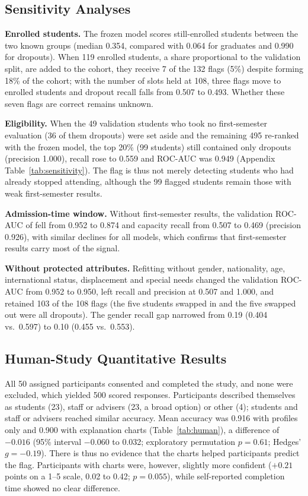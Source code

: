 \subsection{Sensitivity Analyses}
\label{sec:sensitivity}

\textbf{Enrolled students.} The frozen model scores still-enrolled students between the two known
groups (median 0.354, compared with 0.064 for graduates and 0.990 for dropouts). When 119 enrolled
students, a share proportional to the validation split, are added to the cohort, they receive 7 of
the 132 flags (5\%) despite forming 18\% of the cohort; with the number of slots held at 108, three flags move to enrolled students and
dropout recall falls from 0.507 to 0.493. Whether these seven flags are correct remains unknown.

\textbf{Eligibility.} When the 49 validation students who took no first-semester evaluation (36 of
them dropouts) were set aside and the remaining 495 re-ranked with the frozen model, the top 20\%
(99 students) still contained only dropouts (precision 1.000), recall rose to 0.559 and ROC-AUC was
0.949 (Appendix Table~\ref{tab:sensitivity}). The flag is thus not merely detecting students who had
already stopped attending, although the 99 flagged students remain those with weak first-semester
results.

\textbf{Admission-time window.} Without first-semester results, the validation ROC-AUC of \tabicl
fell from 0.952 to 0.874 and capacity recall from 0.507 to 0.469 (precision 0.926), with similar
declines for all models, which confirms that first-semester results carry most of the signal.

\textbf{Without protected attributes.} Refitting \tabicl without gender, nationality, age,
international status, displacement and special needs changed the validation ROC-AUC from 0.952 to
0.950, left recall and precision at 0.507 and 1.000, and retained 103 of the 108 flags (the five
students swapped in and the five swapped out were all dropouts). The gender recall gap narrowed from
0.19 (0.404 vs.\ 0.597) to 0.10 (0.455 vs.\ 0.553).

\subsection{Human-Study Quantitative Results}
\label{sec:human}

All 50 assigned participants consented and completed the study, and none were excluded, which
yielded 500 scored responses. Participants described themselves as students (23), staff or advisers
(23, a broad option) or other (4); students and staff or advisers reached similar accuracy. Mean accuracy was 0.916 with
profiles only and 0.900 with explanation charts (Table~\ref{tab:human}), a difference of $-0.016$
(95\% interval $-0.060$ to 0.032; exploratory permutation $p=0.61$; Hedges' $g=-0.19$). There is
thus no evidence that the charts helped participants predict the flag. Participants with charts
were, however, slightly more confident ($+0.21$ points on a 1--5 scale, 0.02 to 0.42; $p=0.055$),
while self-reported completion time showed no clear difference.

